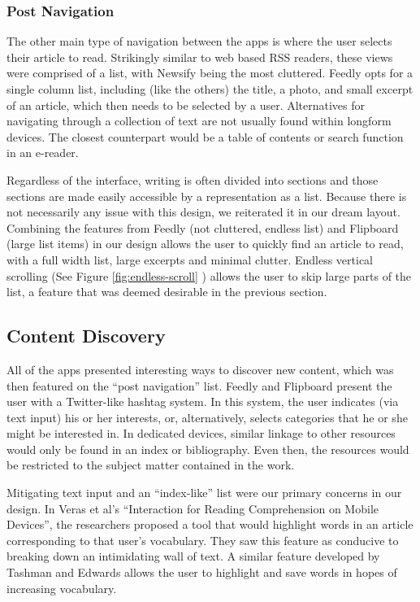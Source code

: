 \documentclass[11pt, oneside]{article}   	%
\begin{document}
\subsubsection{Post Navigation}
The other main type of navigation between the apps is where the user selects their article to read. Strikingly similar to web based RSS readers, these views were comprised of a list, with Newsify being the most cluttered. Feedly opts for a single column list, including (like the others) the title, a photo, and small excerpt of an article, which then needs to be selected by a user. Alternatives for navigating through a collection of text are not usually found within longform devices. The closest counterpart would be a table of contents or search function in an e-reader.

Regardless of the interface, writing is often divided into sections and those sections are made easily accessible by a representation as a list. Because there is not necessarily any issue with this design, we reiterated it in our dream layout. Combining the features from Feedly (not cluttered, endless list) and Flipboard (large list items) in our design allows the user to quickly find an article to read, with a full width list, large excerpts and minimal clutter. Endless vertical scrolling (See Figure \ref{fig:endless-scroll} ) allows the user to skip large parts of the list, a feature that was deemed desirable in the previous section.

\subsection{Content Discovery}
All of the apps presented interesting ways to discover new content, which was then featured on the ``post navigation'' list. Feedly and Flipboard present the user with a Twitter-like hashtag system. In this system, the user indicates (via text input) his or her interests, or, alternatively, selects categories that he or she might be interested in. In dedicated devices, similar linkage to other resources would only be found in an index or bibliography. Even then, the resources would be restricted to the subject matter contained in the work.

Mitigating text input and an ``index-like'' list were our primary concerns in our design. In Veras et al's ``Interaction for Reading Comprehension on Mobile Devices'', the researchers proposed a tool that would highlight words in an article corresponding to that user's vocabulary. They saw this feature as conducive to breaking down an intimidating wall of text. A similar feature developed by Tashman and Edwards allows the user to highlight and save words in hopes of increasing vocabulary.
\end{document}
